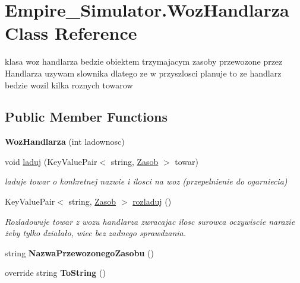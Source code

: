 \hypertarget{class_empire___simulator_1_1_woz_handlarza}{\section{Empire\+\_\+\+Simulator.\+Woz\+Handlarza Class Reference}
\label{class_empire___simulator_1_1_woz_handlarza}
}


klasa woz handlarza bedzie obiektem trzymajacym zasoby przewozone przez Handlarza uzywam slownika dlatego ze w przyszlosci planuje to ze handlarz bedzie wozil kilka roznych towarow  


\subsection*{Public Member Functions}
\begin{DoxyCompactItemize}
\item 
\hypertarget{class_empire___simulator_1_1_woz_handlarza_ae1de7eb5d33e5f74909d25628e759164}{{\bfseries Woz\+Handlarza} (int ladownosc)}\label{class_empire___simulator_1_1_woz_handlarza_ae1de7eb5d33e5f74909d25628e759164}

\item 
void \hyperlink{class_empire___simulator_1_1_woz_handlarza_a9946b05459f36955d26386b8bc91076d}{laduj} (Key\+Value\+Pair$<$ string, \hyperlink{class_empire___simulator_1_1_zasob}{Zasob} $>$ towar)
\begin{DoxyCompactList}\small\item\em laduje towar o konkretnej nazwie i ilosci na woz (przepelnienie do ogarniecia) \end{DoxyCompactList}\item 
Key\+Value\+Pair$<$ string, \hyperlink{class_empire___simulator_1_1_zasob}{Zasob} $>$ \hyperlink{class_empire___simulator_1_1_woz_handlarza_a5dfcb6e147923716145ba925b1b457b8}{rozladuj} ()
\begin{DoxyCompactList}\small\item\em Rozladowuje towar z wozu handlarza zwracajac ilosc surowca oczywiscie narazie żeby tylko działało, wiec bez zadnego sprawdzania. \end{DoxyCompactList}\item 
\hypertarget{class_empire___simulator_1_1_woz_handlarza_a3dbe23380236fb9eaa6851abaf59cd3e}{string {\bfseries Nazwa\+Przewozonego\+Zasobu} ()}\label{class_empire___simulator_1_1_woz_handlarza_a3dbe23380236fb9eaa6851abaf59cd3e}

\item 
\hypertarget{class_empire___simulator_1_1_woz_handlarza_afe055447c6b88b189bbf9e6667809abc}{override string {\bfseries To\+String} ()}\label{class_empire___simulator_1_1_woz_handlarza_afe055447c6b88b189bbf9e6667809abc}

\end{DoxyCompactItemize}


